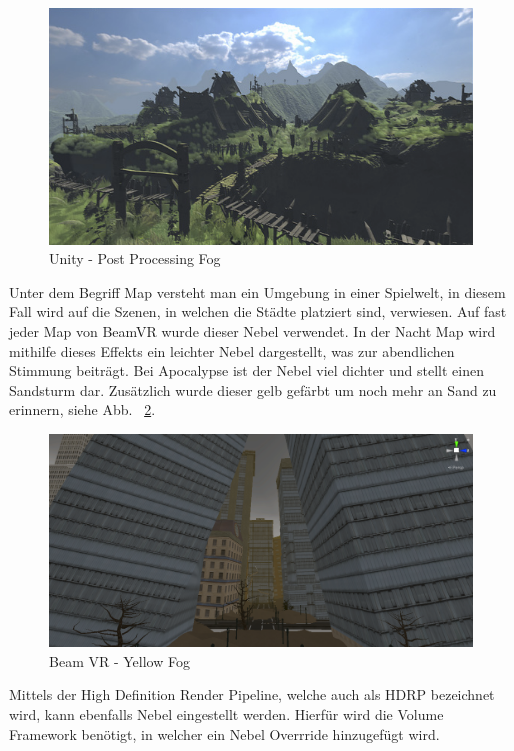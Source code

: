 \begin {figure}
    \centering
    \includegraphics[scale=0.9]{pics/unity-post-processing-fog}
    \caption{Unity - Post Processing Fog}
    \label{fig:unity_post_processing_fog}
\end {figure}
Unter dem Begriff Map versteht man ein Umgebung in einer Spielwelt, in diesem Fall wird auf die Szenen, in welchen die Städte platziert sind, verwiesen.
Auf fast jeder Map von BeamVR wurde dieser Nebel verwendet.
In der Nacht Map wird mithilfe dieses Effekts ein leichter Nebel dargestellt, was zur abendlichen Stimmung beitr\"agt.
Bei Apocalypse ist der Nebel viel dichter und stellt einen Sandsturm dar. Zus\"atzlich wurde dieser gelb gef\"arbt um noch mehr an Sand zu erinnern, siehe Abb. ~\ref{fig:beamvr_yellow_fog}.

\begin {figure}
    \centering
    \includegraphics[scale=0.3]{pics/beamvr_yellow_fog}
    \caption{Beam VR - Yellow Fog}
    \label{fig:beamvr_yellow_fog}
\end {figure}

Mittels der High Definition Render Pipeline, welche auch als HDRP bezeichnet wird, kann ebenfalls Nebel eingestellt werden.
Hierfür wird die Volume Framework benötigt, in welcher ein Nebel Overrride hinzugefügt wird.

